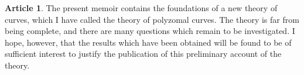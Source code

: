 \documentclass[11pt,a4paper]{article}
\theoremstyle{definition}
\newtheorem{art}{Article}
\begin{document}
\begin{art}
The present memoir contains the foundations of a new theory of curves, which I have called the theory of polyzomal curves. The theory is far from being complete, and there are many questions which remain to be investigated. I hope, however, that the results which have been obtained will be found to be of sufficient interest to justify the publication of this preliminary account of the theory.
\end{art}
\end{document}
